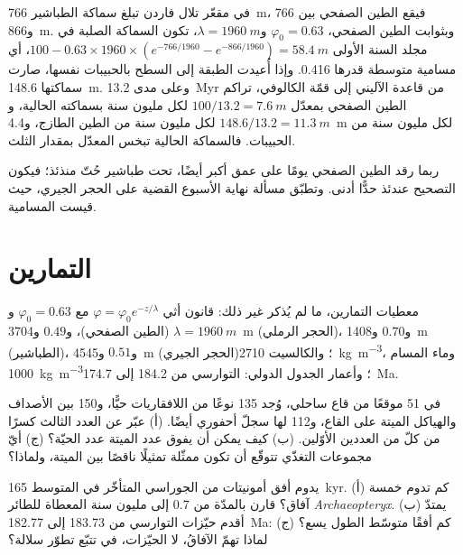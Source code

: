 \begin{example}\label{ex:b2:palaeoenvironments:shale}
في مقعّر تلال فاردن تبلغ سماكة الطباشير \qty{766}{m}، فيقع الطين الصفحي بين
766 و\qty{866}{m}. وبثوابت الطين الصفحي، $\varphi_0 = 0.63$ و$\lambda =
\qty{1960}{m}$، تكون السماكة الصلبة في مجلد السنة الأولى $100 - 0.63 \times 1960 \times
(e^{-766/1960} - e^{-866/1960}) = \qty{58.4}{m}$، أي مسامية متوسطة قدرها 0.416. وإذا أُعيدت الطبقة إلى
السطح بالحبيبات نفسها، صارت سماكتها \qty{148.6}{m}. وعلى مدى \qty{13.2}{Myr} من
قاعدة الآليني إلى قمّة الكالوفي، تراكم الطين الصفحي بمعدّل $100/13.2 =
\qty{7.6}{m}$ لكل مليون سنة بسماكته الحالية، و$148.6/13.2 = \qty{11.3}{m}$ لكل مليون
سنة من الطين الطازج، و\qty{4.4}{m} لكل مليون سنة من الحبيبات. فالسماكة الحالية
تبخس المعدّل بمقدار الثلث.
\end{example}

ربما رقد الطين الصفحي يومًا على عمق أكبر أيضًا، تحت طباشير حُتّ منذئذ؛ فيكون التصحيح عندئذ
حدًّا أدنى. وتطبّق مسألة نهاية الأسبوع القضية على الحجر الجيري، حيث قيست
المسامية.

\section*{التمارين}\label{sec:b2:palaeoenvironments:exercises}

معطيات التمارين، ما لم يُذكر غير ذلك: قانون أثي $\varphi = \varphi_0 e^{-z/\lambda}$
مع $\varphi_0 = 0.63$ و$\lambda = \qty{1960}{m}$ (الطين الصفحي)، و$0.49$ و\qty{3704}{m} (الحجر الرملي)،
و$0.70$ و\qty{1408}{m} (الطباشير)، و$0.51$ و\qty{4545}{m} (الحجر الجيري)؛ والكالسيت \qty{2710}{kg.m^{-3}}،
وماء المسام \qty{1000}{kg.m^{-3}}؛ وأعمار الجدول الدولي: التوارسي من 184.2 إلى
\qty{174.7}{Ma}.

\begin{exercise}[$\star$]\label{exo:b2:palaeoenvironments:1}
في 51 موقعًا من قاع ساحلي، وُجد 135 نوعًا من اللافقاريات حيًّا، و150 بين الأصداف
والهياكل الميتة على القاع، و112 لها سجلّ أحفوري أيضًا. (أ) عبّر عن العدد الثالث
كسرًا من كلّ من العددين الأوّلين. (ب) كيف يمكن أن يفوق عدد الميتة عدد الحيّة؟ (ج)
أيّ مجموعات التغذّي تتوقّع أن تكون ممثّلة تمثيلًا ناقصًا بين الميتة، ولماذا؟
\end{exercise}

\begin{exercise}[$\star$]\label{exo:b2:palaeoenvironments:2}
يدوم أفق أمونيتات من الجوراسي المتأخّر في المتوسط \qty{165}{kyr}. (أ) كم تدوم خمسة آفاق؟
قارن بالمدّة من 0.7 إلى مليون سنة المعطاة للطائر \emph{Archaeopteryx}. (ب) يمتدّ أقدم حيّزات
التوارسي من 183.73 إلى \qty{182.77}{Ma}: كم أفقًا متوسّط الطول يسع؟
(ج) لماذا تهمّ الآفاقُ، لا الحيّزات، في تتبّع تطوّر سلالة؟
\end{exercise}

